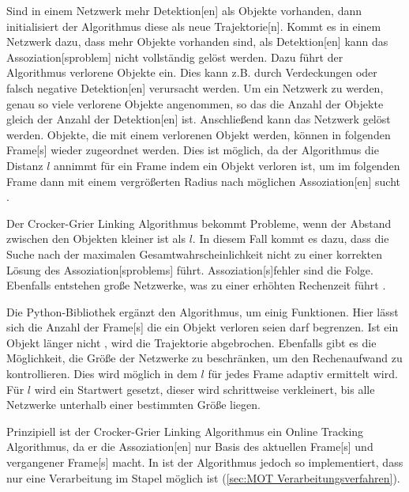 Sind in einem Netzwerk mehr \gls{Detektion}[en] als Objekte vorhanden, dann initialisiert der Algorithmus diese als neue \gls{Trajektorie}[n]. Kommt es in einem Netzwerk dazu, dass mehr Objekte vorhanden sind, als \gls{Detektion}[en] kann das \gls{Assoziation}[sproblem] nicht vollständig gelöst werden. Dazu führt der Algorithmus verlorene Objekte ein. Dies kann z.B. durch Verdeckungen oder falsch negative \gls{Detektion}[en] verursacht werden. Um ein Netzwerk zu  werden, genau so viele verlorene Objekte angenommen, so das die Anzahl der Objekte gleich der Anzahl der \gls{Detektion}[en] ist. Anschließend kann das Netzwerk gelöst werden. Objekte, die mit einem verlorenen Objekt  werden, können in folgenden \gls{Frame}[s] wieder zugeordnet werden. Dies ist möglich, da der Algorithmus die Distanz \(l\) annimmt für ein \gls{Frame} indem ein Objekt verloren ist, um im folgenden \gls{Frame} dann mit einem vergrößerten Radius nach möglichen \gls{Assoziation}[en] sucht \cite{Crocker.1996}. \par 

Der Crocker-Grier Linking Algorithmus bekommt Probleme, wenn der Abstand zwischen den Objekten kleiner ist als \(l\). In diesem Fall kommt es dazu, dass die Suche nach der maximalen Gesamtwahrscheinlichkeit nicht zu einer korrekten Lösung des \gls{Assoziation}[sproblems] führt. \gls{Assoziation}[s]fehler sind die Folge. Ebenfalls entstehen große Netzwerke, was zu einer erhöhten Rechenzeit führt \cite{Crocker.1996}. \par

Die \gls{Python}-\gls{Bibliothek} \cite{Allan.2023} ergänzt den Algorithmus, um einig Funktionen. Hier lässt sich die Anzahl der \gls{Frame}[s] die ein Objekt verloren seien darf begrenzen. Ist ein Objekt länger nicht , wird die \gls{Trajektorie} abgebrochen. Ebenfalls gibt es die Möglichkeit, die Größe der Netzwerke zu beschränken, um den Rechenaufwand zu kontrollieren. Dies wird möglich in dem \(l\) für jedes \gls{Frame} adaptiv ermittelt wird. Für \(l\) wird ein Startwert gesetzt, dieser wird schrittweise verkleinert, bis alle Netzwerke unterhalb einer bestimmten Größe liegen. \par

Prinzipiell ist der Crocker-Grier Linking Algorithmus ein \gls{Online Tracking} Algorithmus, da er die \gls{Assoziation}[en] nur Basis des aktuellen \gls{Frame}[s] und vergangener \gls{Frame}[s] macht. In \cite{Allan.2023} ist der Algorithmus jedoch so implementiert, dass nur eine Verarbeitung im Stapel möglich ist (\autoref{sec:MOT Verarbeitungsverfahren}). 

